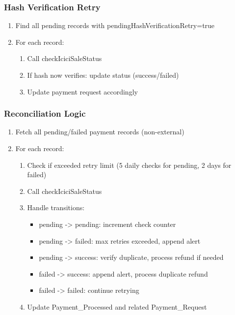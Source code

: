 \documentclass[12pt,a4paper]{article}
\begin{document}
\subsubsection{Hash Verification Retry}
\begin{enumerate}
  \item Find all pending records with pendingHashVerificationRetry=true
  \item For each record:
    \begin{enumerate}
      \item Call checkIciciSaleStatus
      \item If hash now verifies: update status (success/failed)
      \item Update payment request accordingly
    \end{enumerate}
\end{enumerate}

\subsubsection{Reconciliation Logic}
\begin{enumerate}
  \item Fetch all pending/failed payment records (non-external)
  \item For each record:
    \begin{enumerate}
      \item Check if exceeded retry limit (5 daily checks for pending, 2 days for failed)
      \item Call checkIciciSaleStatus
      \item Handle transitions:
      \begin{itemize}
        \item pending -> pending: increment check counter
        \item pending -> failed: max retries exceeded, append alert
        \item pending -> success: verify duplicate, process refund if needed
        \item failed -> success: append alert, process duplicate refund
        \item failed -> failed: continue retrying
      \end{itemize}
      \item Update Payment\_Processed and related Payment\_Request
    \end{enumerate}
\end{enumerate}
\end{document}

